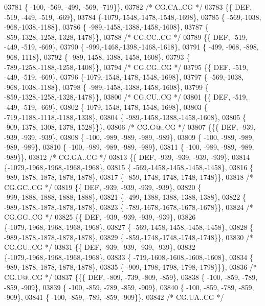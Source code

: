 \begin{DoxyCode}
03781 \{ -100, -569, -499, -569, -719\}\},
03782 \textcolor{comment}{/* CG.CA..CG */}
03783 \{\{  DEF, -519, -449, -519, -669\},
03784 \{-1079,-1548,-1478,-1548,-1698\},
03785 \{ -569,-1038, -968,-1038,-1188\},
03786 \{ -989,-1458,-1388,-1458,-1608\},
03787 \{ -859,-1328,-1258,-1328,-1478\}\},
03788 \textcolor{comment}{/* CG.CC..CG */}
03789 \{\{  DEF, -519, -449, -519, -669\},
03790 \{ -999,-1468,-1398,-1468,-1618\},
03791 \{ -499, -968, -898, -968,-1118\},
03792 \{ -989,-1458,-1388,-1458,-1608\},
03793 \{ -789,-1258,-1188,-1258,-1408\}\},
03794 \textcolor{comment}{/* CG.CG..CG */}
03795 \{\{  DEF, -519, -449, -519, -669\},
03796 \{-1079,-1548,-1478,-1548,-1698\},
03797 \{ -569,-1038, -968,-1038,-1188\},
03798 \{ -989,-1458,-1388,-1458,-1608\},
03799 \{ -859,-1328,-1258,-1328,-1478\}\},
03800 \textcolor{comment}{/* CG.CU..CG */}
03801 \{\{  DEF, -519, -449, -519, -669\},
03802 \{-1079,-1548,-1478,-1548,-1698\},
03803 \{ -719,-1188,-1118,-1188,-1338\},
03804 \{ -989,-1458,-1388,-1458,-1608\},
03805 \{ -909,-1378,-1308,-1378,-1528\}\}\},
03806 \textcolor{comment}{/* CG.G@..CG */}
03807 \{\{\{  DEF, -939, -939, -939, -939\},
03808 \{ -100, -989, -989, -989, -989\},
03809 \{ -100, -989, -989, -989, -989\},
03810 \{ -100, -989, -989, -989, -989\},
03811 \{ -100, -989, -989, -989, -989\}\},
03812 \textcolor{comment}{/* CG.GA..CG */}
03813 \{\{  DEF, -939, -939, -939, -939\},
03814 \{-1079,-1968,-1968,-1968,-1968\},
03815 \{ -569,-1458,-1458,-1458,-1458\},
03816 \{ -989,-1878,-1878,-1878,-1878\},
03817 \{ -859,-1748,-1748,-1748,-1748\}\},
03818 \textcolor{comment}{/* CG.GC..CG */}
03819 \{\{  DEF, -939, -939, -939, -939\},
03820 \{ -999,-1888,-1888,-1888,-1888\},
03821 \{ -499,-1388,-1388,-1388,-1388\},
03822 \{ -989,-1878,-1878,-1878,-1878\},
03823 \{ -789,-1678,-1678,-1678,-1678\}\},
03824 \textcolor{comment}{/* CG.GG..CG */}
03825 \{\{  DEF, -939, -939, -939, -939\},
03826 \{-1079,-1968,-1968,-1968,-1968\},
03827 \{ -569,-1458,-1458,-1458,-1458\},
03828 \{ -989,-1878,-1878,-1878,-1878\},
03829 \{ -859,-1748,-1748,-1748,-1748\}\},
03830 \textcolor{comment}{/* CG.GU..CG */}
03831 \{\{  DEF, -939, -939, -939, -939\},
03832 \{-1079,-1968,-1968,-1968,-1968\},
03833 \{ -719,-1608,-1608,-1608,-1608\},
03834 \{ -989,-1878,-1878,-1878,-1878\},
03835 \{ -909,-1798,-1798,-1798,-1798\}\}\},
03836 \textcolor{comment}{/* CG.U@..CG */}
03837 \{\{\{  DEF, -809, -739, -809, -859\},
03838 \{ -100, -859, -789, -859, -909\},
03839 \{ -100, -859, -789, -859, -909\},
03840 \{ -100, -859, -789, -859, -909\},
03841 \{ -100, -859, -789, -859, -909\}\},
03842 \textcolor{comment}{/* CG.UA..CG */}

\end{DoxyCode}
